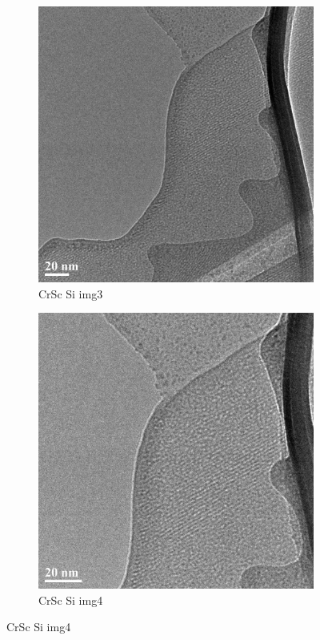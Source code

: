 \begin{figure}[h!]
	\centering
	\begin{subfigure}[b]{0.45\textwidth}
		\includegraphics[width=\textwidth]{./Images/TEM/CrSc_Si_img3}
		\caption{CrSc Si img3}
		\label{fig:CrSc_Si_img3}
	\end{subfigure}
	\begin{subfigure}[b]{0.45\textwidth}
		\includegraphics[width=\textwidth]{./Images/TEM/CrSc_Si_img4}
		\caption{CrSc Si img4}
		\label{fig:CrSc_Si_img4}
	\end{subfigure}


\end{figure}
